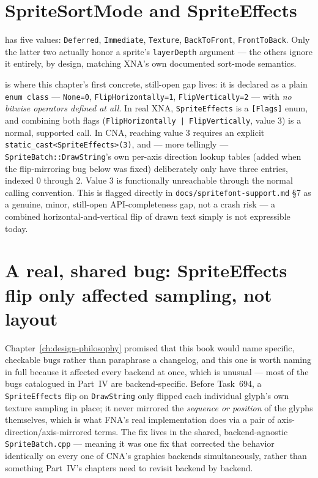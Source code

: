 \section{SpriteSortMode and SpriteEffects}

 has five values: \texttt{Deferred}, \texttt{Immediate},
\texttt{Texture}, \texttt{BackToFront}, \texttt{FrontToBack}. Only the latter two actually
honor a sprite's \texttt{layerDepth} argument --- the others ignore it entirely, by design,
matching XNA's own documented sort-mode semantics.

 is where this chapter's first concrete, still-open gap lives:
it is declared as a plain \texttt{enum class} --- \texttt{None=0}, \texttt{FlipHorizontally=1},
\texttt{FlipVertically=2} --- with \emph{no bitwise operators defined at all}. In real XNA,
\texttt{SpriteEffects} is a \texttt{[Flags]} enum, and combining both flags
(\texttt{FlipHorizontally | FlipVertically}, value 3) is a normal, supported call. In CNA,
reaching value 3 requires an explicit \texttt{static\_cast<SpriteEffects>(3)}, and --- more
tellingly --- \texttt{SpriteBatch::DrawString}'s own per-axis direction lookup tables (added
when the flip-mirroring bug below was fixed) deliberately only have three entries, indexed
0 through 2. Value 3 is functionally unreachable through the normal calling convention. This
is flagged directly in \texttt{docs/spritefont-support.md} \S7 as a genuine, minor,
still-open API-completeness gap, not a crash risk --- a combined horizontal-and-vertical
flip of drawn text simply is not expressible today.

\section{A real, shared bug: SpriteEffects flip only affected sampling, not layout}

Chapter~\ref{ch:design-philosophy} promised that this book would name specific, checkable
bugs rather than paraphrase a changelog, and this one is worth naming in full because it
affected every backend at once, which is unusual --- most of the bugs catalogued in Part~IV
are backend-specific. Before Task~694, a \texttt{SpriteEffects} flip on
\texttt{DrawString} only flipped each individual glyph's own texture sampling in place; it
never mirrored the \emph{sequence or position} of the glyphs themselves, which is what FNA's
real implementation does via a pair of axis-direction/axis-mirrored terms. The fix lives in
the shared, backend-agnostic \texttt{SpriteBatch.cpp} --- meaning it was one fix that
corrected the behavior identically on every one of CNA's graphics backends simultaneously,
rather than something Part~IV's chapters need to revisit backend by backend.

